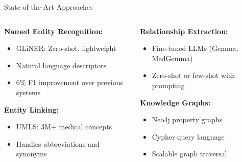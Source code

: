 \documentclass[aspectratio=169, 11pt]{beamer}
\begin{document}
\begin{frame}{State-of-the-Art Approaches}
    \vspace{0.3cm}
    \begin{columns}[T]
        \begin{column}{0.5\textwidth}
            \textbf{Named Entity Recognition:}
            \begin{itemize}
                \setlength{\itemsep}{0.2cm}
                \item GLiNER: Zero-shot, lightweight
                \item Natural language descriptors
                \item 6\% F1 improvement over previous systems
            \end{itemize}

            \vspace{0.4cm}
            \textbf{Entity Linking:}
            \begin{itemize}
                \setlength{\itemsep}{0.2cm}
                \item UMLS: 3M+ medical concepts
                \item Handles abbreviations and synonyms
            \end{itemize}
        \end{column}
        \begin{column}{0.5\textwidth}
            \textbf{Relationship Extraction:}
            \begin{itemize}
                \setlength{\itemsep}{0.2cm}
                \item Fine-tuned LLMs (Gemma, MedGemma)
                \item Zero-shot or few-shot with prompting
            \end{itemize}
            
            \vspace{0.4cm}
            \textbf{Knowledge Graphs:}
            \begin{itemize}
                \setlength{\itemsep}{0.2cm}
                \item Neo4j property graphs
                \item Cypher query language
                \item Scalable graph traversal
            \end{itemize}
        \end{column}
    \end{columns}
\end{frame}
\end{document}

